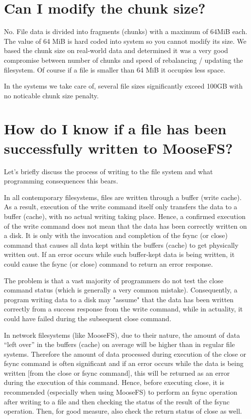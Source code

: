 \documentclass[a4paper,11pt,english]{report}
\begin{document}
		
		\section{Can I modify the chunk size?}
		No. File data is divided into fragments (chunks) with a maximum of 64MiB each. The value of 64 MiB is hard coded into system so you cannot modify its size. We based the chunk size on real-world data and determined it was a very good compromise between number of chunks and speed of rebalancing / updating the filesystem. Of course if a file is smaller than 64 MiB it occupies less space. 
		
		In the systems we take care of, several file sizes significantly exceed 100GB with no noticable chunk size penalty.
		
		
		\section{How do I know if a file has been successfully written to MooseFS?}
		Let's briefly discuss the process of writing to the file system and what programming consequences this bears. 
		
		In all contemporary filesystems, files are written through a buffer (write cache). As a result, execution of the write command itself only transfers the data to a buffer (cache), with no actual writing taking place. Hence, a confirmed execution of the write command does not mean that the data has been correctly written on a disk. It is only with the invocation and completion of the fsync (or close) command that causes all data kept within the buffers (cache) to get physically written out. If an error occurs while such buffer-kept data is being written, it could cause the fsync (or close) command to return an error response.   
		
		The problem is that a vast majority of programmers do not test the close command status (which is generally a very common mistake). Consequently, a program writing data to a disk may "assume" that the data has been written correctly from a success response from the write command, while in actuality, it could have failed during the subsequent close command. 
		
		In network filesystems (like MooseFS), due to their nature, the amount of data ``left over'' in the buffers (cache) on average will be higher than in regular file systems. Therefore the amount of data processed during execution of the close or fsync command is often significant and if an error occurs while the data is being written [from the close or fsync command], this will be returned as an error during the execution of this command. Hence, before executing close, it is recommended (especially when using MooseFS) to perform an fsync operation after writing to a file and then checking the status of the result of the fsync operation. Then, for good measure, also check the return status of close as well. 
		
\end{document}
